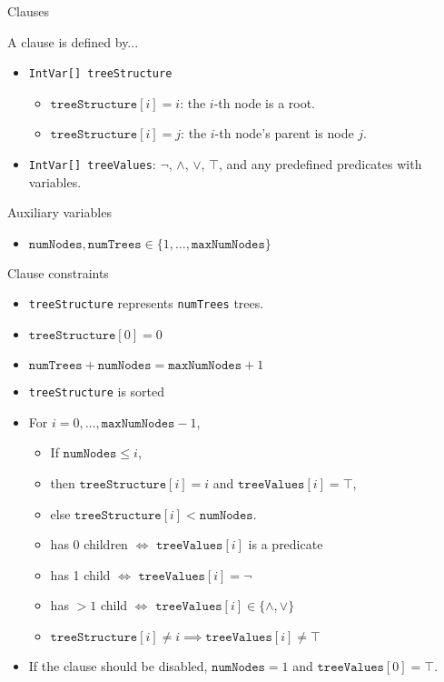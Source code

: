 \documentclass{beamer}
\begin{document}
\begin{frame}{Clauses}
  \begin{block}{A clause is defined by...}
    \begin{itemize}
    \item \texttt{IntVar[] treeStructure}
      \begin{itemize}
      \item $\texttt{treeStructure}[i] = i$: the $i$-th node is a root.
      \item $\texttt{treeStructure}[i] = j$: the $i$-th node's parent is node $j$.
      \end{itemize}
    \item \texttt{IntVar[] treeValues}: $\neg$, $\land$, $\lor$, $\top$, and any
      predefined predicates with variables.
    \end{itemize}
  \end{block}
  \begin{block}{Auxiliary variables}
    \begin{itemize}
    \item $\texttt{numNodes}, \texttt{numTrees} \in \{ 1, \dots, \texttt{maxNumNodes} \}$
    \end{itemize}
  \end{block}
\end{frame}

\begin{frame}{Clause constraints}
  \begin{itemize}
  \item \texttt{treeStructure} represents \texttt{numTrees} trees.
  \item $\texttt{treeStructure}[0] = 0$
  \item $\texttt{numTrees} + \texttt{numNodes} = \texttt{maxNumNodes} + 1$
  \item \texttt{treeStructure} is sorted
  \item For $i = 0, \dots, \texttt{maxNumNodes} - 1$,
    \begin{itemize}
    \item If $\texttt{numNodes} \le i$,
    \item then $\texttt{treeStructure}[i] = i$ and $\texttt{treeValues}[i] = \top$,
    \item else $\texttt{treeStructure}[i] < \texttt{numNodes}$.
    \item has 0 children $\iff$ $\texttt{treeValues}[i]$ is a predicate
    \item has 1 child $\iff$ $\texttt{treeValues}[i] = \neg$
    \item has $>1$ child $\iff$ $\texttt{treeValues}[i] \in \{ \land, \lor \}$
    \item $\texttt{treeStructure}[i] \ne i \implies \texttt{treeValues}[i] \ne \top$
    \end{itemize}
  \item If the clause should be disabled, $\texttt{numNodes} = 1$ and
    $\texttt{treeValues}[0] = \top$.
  \end{itemize}
\end{frame}
\end{document}
